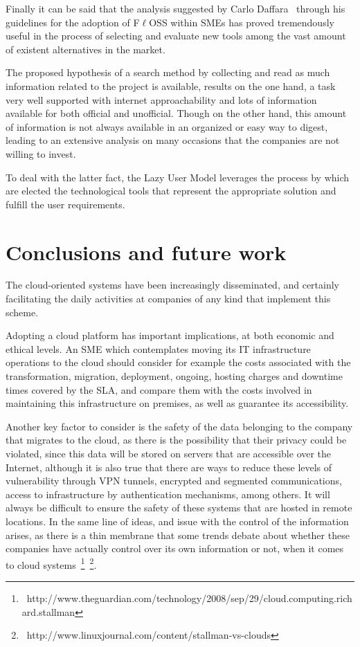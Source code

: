 \documentclass[a4paper, 12pt]{book}
\begin{document}
\noindent Finally it can be said that the analysis suggested by Carlo Daffara~\cite{Daffara1} through his guidelines for the adoption of F$\ell$OSS within SMEs has proved tremendously useful in the process of selecting and evaluate new tools among the vast amount of existent alternatives in the market.\bigskip

\noindent The proposed hypothesis of a search method by collecting and read as much information related to the project is available, results on the one hand, a task very well supported with internet approachability and lots of information available for both official and unofficial. Though on the other hand, this amount of information is not always available in an organized or easy way to digest, leading to an extensive analysis on many occasions that the companies are not willing to invest.\bigskip

\noindent To deal with the latter fact, the Lazy User Model leverages the process by which are elected the technological tools that represent the appropriate solution and fulfill the user requirements. 



%
\chapter{Conclusions and future work}
\label{chap:conclusions}

\noindent The cloud-oriented systems have been increasingly disseminated, and certainly facilitating the daily activities at companies of any kind that implement this scheme.\bigskip

\noindent Adopting a cloud platform has important implications, at both economic and ethical levels. An SME which contemplates moving its IT infrastructure operations to the cloud should consider for example the costs associated with the transformation, migration, deployment, ongoing, hosting charges and downtime times covered by the SLA, and compare them with the costs involved in maintaining this infrastructure on premises, as well as guarantee its accessibility.\bigskip

\noindent Another key factor to consider is the safety of the data belonging to the company that migrates to the cloud, as there is the possibility that their privacy could be violated, since this data will be stored on servers that are accessible over the Internet, although it is also true that there are ways to reduce these levels of vulnerability through VPN tunnels, encrypted and segmented communications, access to infrastructure by authentication mechanisms, among others. It will always be difficult to ensure the safety of these systems that are hosted in remote locations. In the same line of ideas, and issue with the control of the information arises, as there is a thin membrane that some trends debate about whether these companies have actually control over its own information or not, when it comes to cloud systems~\footnote{{\tiny\ http://www.theguardian.com/technology/2008/sep/29/cloud.computing.richard.stallman}}~\footnote{{\tiny\ http://www.linuxjournal.com/content/stallman-vs-clouds}}.\bigskip
\end{document}
